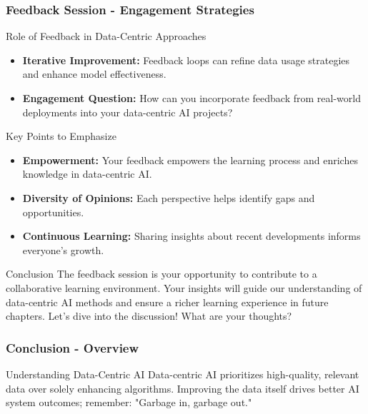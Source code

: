 \documentclass[aspectratio=169]{beamer}
\begin{document}
\begin{frame}[fragile]
    \frametitle{Feedback Session - Engagement Strategies}
    \begin{block}{Role of Feedback in Data-Centric Approaches}
        \begin{itemize}
            \item \textbf{Iterative Improvement:} Feedback loops can refine data usage 
            strategies and enhance model effectiveness.
            \item \textbf{Engagement Question:} How can you incorporate feedback 
            from real-world deployments into your data-centric AI projects?
        \end{itemize}
    \end{block}
    
    \begin{block}{Key Points to Emphasize}
        \begin{itemize}
            \item \textbf{Empowerment:} Your feedback empowers the learning process 
            and enriches knowledge in data-centric AI.
            \item \textbf{Diversity of Opinions:} Each perspective helps identify 
            gaps and opportunities.
            \item \textbf{Continuous Learning:} Sharing insights about recent developments 
            informs everyone’s growth.
        \end{itemize}
    \end{block}
    
    \begin{block}{Conclusion}
        The feedback session is your opportunity to contribute to a collaborative 
        learning environment. Your insights will guide our understanding of 
        data-centric AI methods and ensure a richer learning experience in future 
        chapters. Let’s dive into the discussion! What are your thoughts?
    \end{block}
\end{frame}

\begin{frame}[fragile]
    \frametitle{Conclusion - Overview}
    \begin{block}{Understanding Data-Centric AI}
        Data-centric AI prioritizes high-quality, relevant data over solely enhancing algorithms. Improving the data itself drives better AI system outcomes; remember: "Garbage in, garbage out."
    \end{block}
\end{frame}
\end{document}

